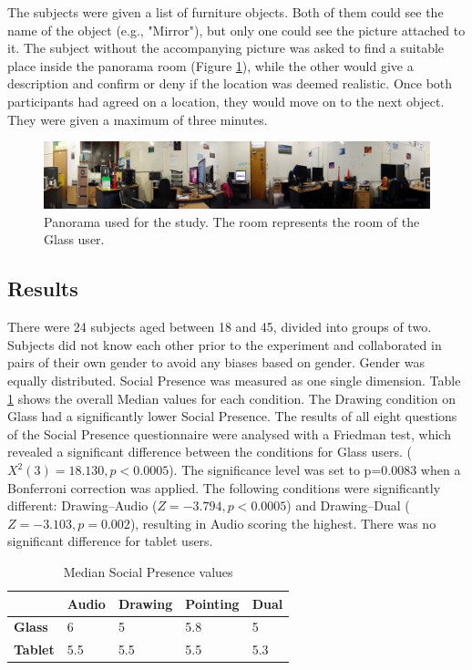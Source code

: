 The subjects were given a list of furniture objects. Both of them could see the name of the object (e.g., "Mirror"), but only one could see the picture attached to it. The subject without the accompanying picture was asked to find a suitable place inside the panorama room (Figure \ref{fig:ismar14:envrionment-setup}), while the other would give a description and confirm or deny if the location was deemed realistic. Once both participants had agreed on a location, they would move on to the next object. They were given a maximum of three minutes.

\begin{figure}[ht]
	\centering
	\includegraphics[width=\linewidth]{images/ismar14/envrionment-setup}
	\caption{Panorama used for the study. The room represents the room of the Glass user.}
	\label{fig:ismar14:envrionment-setup}
\end{figure}

\subsection{Results}

There were 24 subjects aged between 18 and 45, divided into groups of two. Subjects did not know each other prior to the experiment and collaborated in pairs of their own gender to avoid any biases based on gender. Gender was equally distributed. Social Presence was measured as one single dimension. Table \ref{tbl:ismar14-results} shows the overall Median values for each condition. The Drawing condition on Glass had a significantly lower Social Presence. The results of all eight questions of the Social Presence questionnaire were analysed with a Friedman test, which revealed a significant difference between the conditions for Glass users. ($X^2(3)=18.130, p<0.0005$). The significance level was set to p=0.0083 when a Bonferroni correction was applied. The following conditions were significantly different: Drawing–Audio ($Z=-3.794, p<0.0005$) and Drawing–Dual ($Z=-3.103, p=0.002$), resulting in Audio scoring the highest. There was no significant difference for tablet users.

\begin{table}[]
    \caption{Median Social Presence values}
    \begin{tabular}{@{}lllll@{}}
    \toprule
    \textbf{}       & \textbf{Audio} & \textbf{Drawing} & \textbf{Pointing} & \textbf{Dual} \\ \midrule
    \textbf{Glass}  & 6              & 5                & 5.8               & 5             \\
    \textbf{Tablet} & 5.5            & 5.5              & 5.5               & 5.3           \\ \bottomrule
    \end{tabular}
    \label{tbl:ismar14-results}
\end{table}

